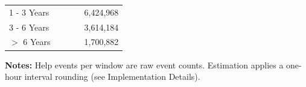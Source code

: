 \begin{table}[H]
\begin{tabular}{@{}lrrrr@{}}
\hspace{1em} 1 - 3 Years & & & & 6,424,968 \\
\hspace{1em} 3 - 6 Years & & & & 3,614,184 \\
\hspace{1em} $>$ 6 Years & & & & 1,700,882 \\
\bottomrule
\end{tabular}
\vspace{0.35em}
\begin{minipage}{\linewidth}
\footnotesize
\raggedright
\textbf{Notes:} Help events per window are raw event counts. Estimation applies a one-hour interval rounding (see Implementation Details).
\end{minipage}
\end{table}